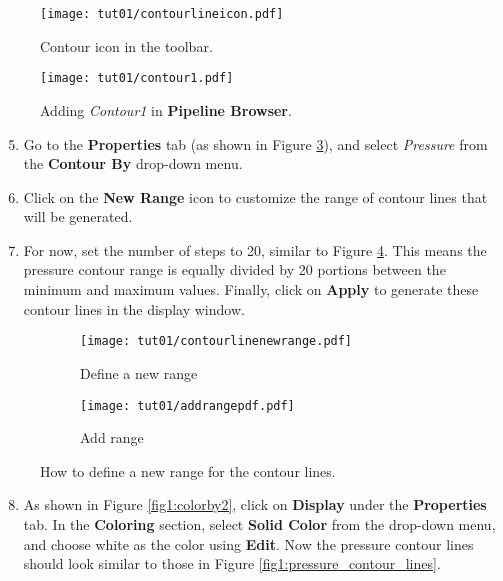 \begin{figure}[!h]
    \centering
    \texttt{[image: tut01/contourlineicon.pdf]}
    \caption{Contour icon in the toolbar.}
    \label{fig1:contour_icon}
\end{figure}
\begin{figure}[!h]
    \centering
    \texttt{[image: tut01/contour1.pdf]}
    \caption{Adding \textit{Contour1} in \textbf{Pipeline Browser}.}
    \label{fig1:contour1}
\end{figure}

\begin{enumerate}[label=\arabic*)]
	\setcounter{enumi}{4}
	\item Go to the \textbf{Properties} tab (as shown in Figure \ref{fig1:contourby a}), and select \textit{Pressure} from the \textbf{Contour By} drop-down menu. \item Click on the \textbf{New Range} icon to customize the range of contour lines that will be generated.
	\item For now, set the number of steps to 20, similar to Figure \ref{fig1:contourby b}. This means the pressure contour range is equally divided by 20 portions between the minimum and maximum values. Finally, click on \textbf{Apply} to generate these contour lines in the display window.
\end{enumerate}
\begin{figure}[!h]
    \centering
     \begin{subfigure}[b]{.4\textwidth}
         \centering
         \texttt{[image: tut01/contourlinenewrange.pdf]}
         \caption{Define a new range}
         \label{fig1:contourby a}
     \end{subfigure}
     \hfill
     \begin{subfigure}[b]{.4\textwidth}
         \centering
         \texttt{[image: tut01/addrangepdf.pdf]}
         \caption{Add range}
         \label{fig1:contourby b}
     \end{subfigure}     
    \caption{How to define a new range for the contour lines.}
    \label{fig1:contourby}
\end{figure}
\begin{enumerate}[label=\arabic*)]
	\setcounter{enumi}{7}
	\item As shown in Figure \ref{fig1:colorby2}, click on \textbf{Display} under the \textbf{Properties} tab. In the \textbf{Coloring} section, select \textbf{Solid Color} from the drop-down menu, and choose white as the color using \textbf{Edit}. Now the pressure contour lines should look similar to those in Figure \ref{fig1:pressure_contour_lines}.
\end{enumerate}
